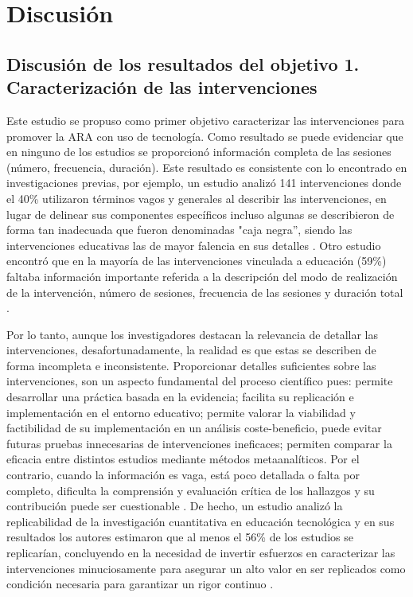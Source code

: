 \documentclass[spanish]{textolivre}
\begin{document}
\section{Discusión}

\subsection{Discusión de los resultados del objetivo 1. Caracterización de las intervenciones}

Este estudio se propuso como primer objetivo caracterizar las intervenciones para promover la ARA con uso de tecnología. Como resultado se puede evidenciar que en ninguno de los estudios se proporcionó información completa de las sesiones (número, frecuencia, duración). Este resultado es consistente con lo encontrado en investigaciones previas, por ejemplo, un estudio analizó 141 intervenciones donde el 40\% utilizaron términos vagos y generales al describir las intervenciones, en lugar de delinear sus componentes específicos incluso algunas se describieron de forma tan inadecuada que fueron denominadas "caja negra”, siendo las intervenciones educativas las de mayor falencia en sus detalles \cite{conn2012unpacking}. Otro estudio encontró que en la mayoría de las intervenciones vinculada a educación (59\%) faltaba información importante referida a la descripción del modo de realización de la intervención, número de sesiones, frecuencia de las sesiones y duración total \cite{palomares2012inadequate}. 

Por lo tanto, aunque los investigadores destacan la relevancia de detallar las intervenciones, desafortunadamente, la realidad es que estas se describen de forma incompleta e inconsistente. Proporcionar detalles suficientes sobre las intervenciones, son un aspecto fundamental del proceso científico pues: permite desarrollar una práctica basada en la evidencia; facilita su replicación e implementación en el entorno educativo; permite valorar la viabilidad y factibilidad de su implementación en un análisis coste-beneficio, puede evitar futuras pruebas innecesarias de intervenciones ineficaces; permiten comparar la eficacia entre distintos estudios mediante métodos metaanalíticos. Por el contrario, cuando la información es vaga, está poco detallada o falta por completo, dificulta la comprensión y evaluación crítica de los hallazgos y su contribución puede ser cuestionable \cite{stanley2018meta}. De hecho, un estudio analizó la replicabilidad de la investigación cuantitativa en educación tecnológica y en sus resultados los autores estimaron que al menos el 56\% de los estudios se replicarían, concluyendo en la necesidad de invertir esfuerzos en caracterizar las intervenciones minuciosamente para asegurar un alto valor en ser replicados como condición necesaria para garantizar un rigor continuo \cite{buckley2022estimating}.
\end{document}
